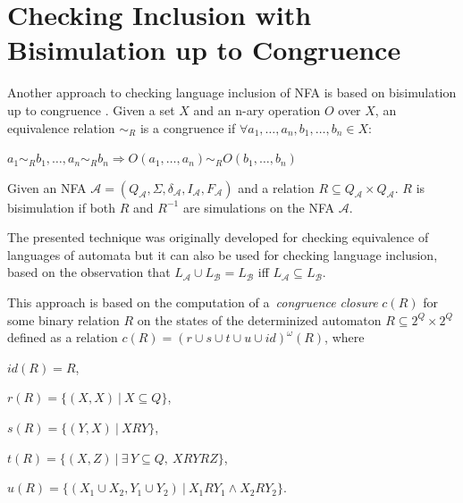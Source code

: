 \section{Checking Inclusion with Bisimulation up to Congruence}
\label{sectionCongr}
Another approach to checking language inclusion of NFA is based on bisimulation up to congruence \cite{popl13}.
Given a set $X$ and an n-ary operation $O$ over $X$, an equivalence relation $\sim_R$ is a congruence if $\forall a_1,\ldots,a_n,b_1,\ldots,b_n\in X$:
		\begin{description}
			\item $a_1 \sim_{R} b_1,\ldots,a_n \sim_{R} b_n \Rightarrow O(a_1,\ldots,a_n) \sim_{R} O(b_1,\ldots,b_n)$
		\end{description}
Given an NFA $\mathcal{A}=(Q_\mathcal{A},\Sigma,\delta_\mathcal{A},I_\mathcal{A},F_\mathcal{A})$ and a relation 
$R\subseteq Q_\mathcal{A}\times Q_\mathcal{A}$. $R$ is bisimulation if both $R$ and $R^{-1}$ are simulations on the NFA $\mathcal{A}$.

The presented technique was originally developed for checking equivalence of languages of automata but it can
also be used for checking language inclusion, based on the observation that $L_\mathcal{A}\cup L_\mathcal{B}= L_\mathcal{B}$ iff 
$L_\mathcal{A}\subseteq L_\mathcal{B}$.

  This approach is based on the computation of a~\emph{congruence closure} $c(R)$ 
  for some binary relation $R$ on the states of the determinized automaton $R \subseteq 2^Q\times 2^Q$ defined 
  as a relation $c(R)=(r\cup s\cup t \cup u\cup id)^{\omega}(R)$, where
  \begin{description}
  \item $id(R)=R$, 
  \item $r(R)=\{(X,X)\ |\ X\subseteq Q\}$, 
  \item $s(R)=\{(Y,X)\ |\ XRY\}$,
  \item $t(R)=\{(X,Z)\ |\ \exists\,Y\subseteq Q,\ XRYRZ\}$,
  \item $u(R)=\{(X_1 \cup X_2,Y_1\cup Y_2)\ |\ X_1 R Y_1 \wedge X_2 R Y_2\}$. 
  \end{description}



